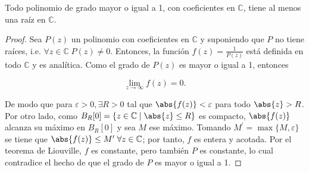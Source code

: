 \documentclass[../main.tex]{subfiles}
\begin{document}
\begin{theorem}
    Todo polinomio de grado mayor o igual a 1, con coeficientes en \(\mathbb{C}\), tiene
    al menos una raíz en \(\mathbb{C}\).
\end{theorem}

\begin{proof}
    Sea \(P(z)\) un polinomio con coeficientes en \(\mathbb{C}\) y suponiendo que \(P\)
    no tiene raíces, i.e. \(\forall z\in \mathbb{C}\; P(z) \neq 0\). Entonces, la
    función \(f(z) = \tfrac{1}{P(z)}\) está definida en todo \(\mathbb{C}\) y es
    analítica. Como el grado de \(P(z)\) es mayor o igual a 1, entonces

    \begin{equation*}
        \lim_{z \to \infty} f(z) = 0.
    \end{equation*}

    De modo que para \(\varepsilon > 0,\exists R > 0\) tal que \(\abs{f(z)} <
    \varepsilon\) para todo \(\abs{z} > R\). Por otro lado, como \(B_{R}[0] = \{z\in
    \mathbb{C} \mid \abs{z} \leq R\}\) es compacto, \(\abs{f(z)}\) alcanza su máximo en
    \(B_{R}[0]\) y sea \(M\) ese máximo. Tomando \(M^{\prime} = \max \bigl\lbrace M,
    \varepsilon \bigr\rbrace\) se tiene que \(\abs{f(z)} \leq M^{\prime}\; \forall z\in
    \mathbb{C}\); por tanto, \(f\) es entera y acotada. Por el teorema de Liouville,
    \(f\) es constante, pero también \(P\) es constante, lo cual contradice el hecho de
    que el grado de \(P\) es mayor o igual a 1.
\end{proof}
\end{document}

